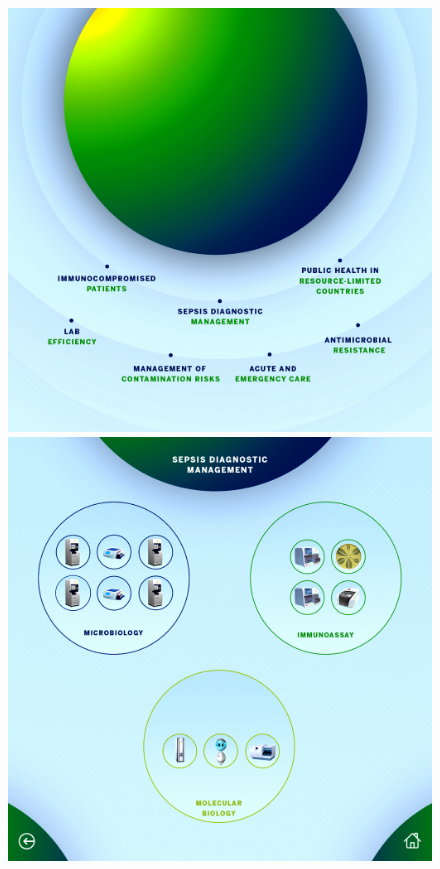 \documentclass{article}
\begin{document}
\begin{figure}[h]
    \centering
    \includegraphics[scale=0.095]{bmx-1-initial.jpg}
    \includegraphics[scale=0.19]{bmx-2-initial.jpg}

\end{figure}
\end{document}
